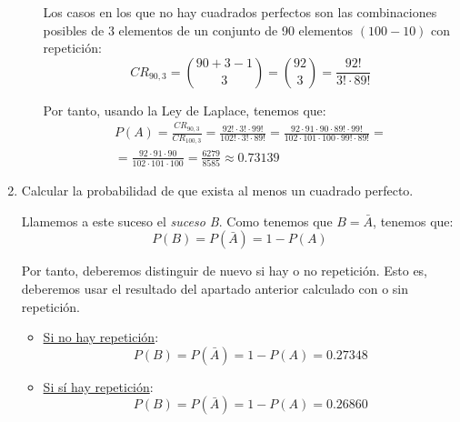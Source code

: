 \begin{ejercicio}
\begin{enumerate}
\begin{itemize}
            Los casos en los que no hay cuadrados perfectos son las combinaciones posibles de 3 elementos de un conjunto de 90 elementos $(100-10)$ con repetición:
            \begin{equation*}
                CR_{90,3}=\binom{90+3-1}{3}=\binom{92}{3}=\frac{92!}{3!\cdot 89!}
            \end{equation*}

            Por tanto, usando la Ley de Laplace, tenemos que:
            \begin{multline*}
                P(A)=\frac{CR_{90,3}}{CR_{100,3}}=\frac{92!\cdot 3!\cdot 99!}{102!\cdot 3!\cdot 89!}
                =\frac{92\cdot 91\cdot 90 \cdot 89!\cdot 99!}{102\cdot 101\cdot 100 \cdot 99!\cdot 89!}
                =\\=
                \frac{92\cdot 91\cdot 90}{102\cdot 101\cdot 100} = \frac{6279}{8585} \approx 0.73139
            \end{multline*}
        \end{itemize}

        \begin{comment}
        Si hay repetición:

        \begin{equation*}
            P(A) = \frac{90^{3}}{100^{3}} = 0.729
        \end{equation*}
        \end{comment}
        
        \item Calcular la probabilidad de que exista al menos un cuadrado perfecto.

        Llamemos a este suceso el \textit{suceso B}. Como tenemos que $B=\bar{A}$, tenemos que:
        \begin{equation*}
            P(B) = P(\bar{A}) = 1 - P(A)
        \end{equation*}

        Por tanto, deberemos distinguir de nuevo si hay o no repetición. Esto es, deberemos usar el resultado del apartado anterior calculado con o sin repetición.

        \begin{itemize}
            \item \underline{Si no hay repetición}:
            \begin{equation*}
                P(B) = P(\bar{A}) = 1 - P(A)=0.27348
            \end{equation*}

            \item \underline{Si sí hay repetición}:
            \begin{equation*}
                P(B) = P(\bar{A}) = 1 - P(A)=0.26860
            \end{equation*}
        \end{itemize}
        

\end{enumerate}
\end{ejercicio}
